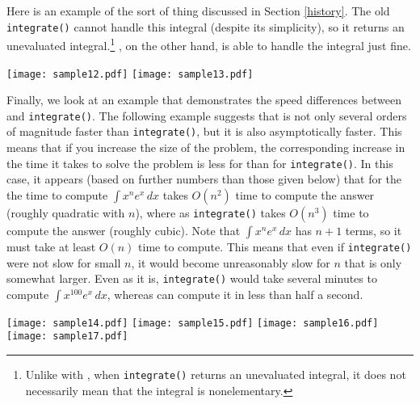 Here is an example of the sort of thing discussed in Section
\ref{history}.  The old \texttt{integrate()} cannot handle this integral
(despite its simplicity), so it returns an unevaluated
integral.\footnote{Unlike with \rischintegrate{}, when
\texttt{integrate()} returns an unevaluated integral, it does not
necessarily mean that the integral is nonelementary.} 
\rischintegrate{}, on the other hand, is able to handle the integral
just fine.

\begin{flushleft}
\texttt{[image: sample12.pdf]}
\texttt{[image: sample13.pdf]}
\end{flushleft}

Finally, we look at an example that demonstrates the speed differences
between \rischintegrate{} and \texttt{integrate()}.  The following
example suggests that \rischintegrate{} is not only several orders of
magnitude faster than \texttt{integrate()}, but it is also asymptotically
faster.  This means that if you increase the size of the problem, the
corresponding increase in the time it takes to solve the problem is less
for \rischintegrate{} than for \texttt{integrate()}.  In this case, it
appears (based on further numbers than those given below) that for the
the time to compute $\int{x^ne^x\,dx}$ \rischintegrate{} takes $O(n^2)$
time to compute the answer (roughly quadratic with $n$), where as
\texttt{integrate()} takes $O(n^3)$ time to compute the answer (roughly
cubic).  Note that $\int{x^ne^x\,dx}$ has $n + 1$ terms, so it must take
at least $O(n)$ time to compute.  This means that even if
\texttt{integrate()} were not slow for small $n$, it would become
unreasonably slow for $n$ that is only somewhat larger.  Even as it is,
\texttt{integrate()} would take several minutes to compute
$\int{x^{100}e^x\,dx}$, whereas \rischintegrate{} can compute it in less
than half a second.

\begin{flushleft}
\texttt{[image: sample14.pdf]}
\texttt{[image: sample15.pdf]}
\texttt{[image: sample16.pdf]}
\texttt{[image: sample17.pdf]}
\end{flushleft}
